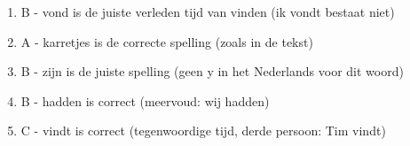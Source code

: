 \begin{oplossing}
\begin{enumerate}
\item B - vond is de juiste verleden tijd van vinden (ik vondt bestaat niet)
\item A - karretjes is de correcte spelling (zoals in de tekst)
\item B - zijn is de juiste spelling (geen y in het Nederlands voor dit woord)
\item B - hadden is correct (meervoud: wij hadden)
\item C - vindt is correct (tegenwoordige tijd, derde persoon: Tim vindt)
\end{enumerate}
\end{oplossing}
